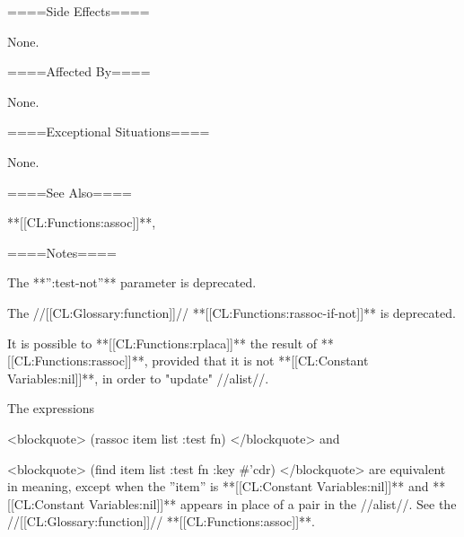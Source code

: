 ====Side Effects====

None.

====Affected By====

None.

====Exceptional Situations====

None.

====See Also====

**[[CL:Functions:assoc]]**,

{\secref\TraversalRules}

====Notes====

The **'':test-not''** parameter is deprecated.

The //[[CL:Glossary:function]]// **[[CL:Functions:rassoc-if-not]]** is deprecated.

It is possible to **[[CL:Functions:rplaca]]** the result of **[[CL:Functions:rassoc]]**, provided that it is not **[[CL:Constant Variables:nil]]**, in order to "update" //alist//.

The expressions

<blockquote> (rassoc item list :test fn) </blockquote> and

<blockquote> (find item list :test fn :key #'cdr) </blockquote> are equivalent in meaning, except when the ''item'' is **[[CL:Constant Variables:nil]]** and **[[CL:Constant Variables:nil]]** appears in place of a pair in the //alist//. See the //[[CL:Glossary:function]]// **[[CL:Functions:assoc]]**.

    
